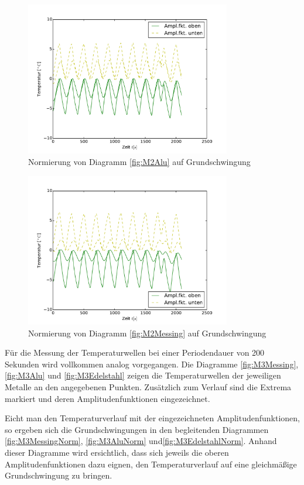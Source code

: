 \begin{figure}[htp]
	\label{fig:M2MessingNorm}
	\centering
	\includegraphics[width=0.8\textwidth]{Bilder/Normierungsauswahl/M2_Alu_norm.pdf}
	\caption{Normierung von Diagramm \ref{fig:M2Alu} auf Grundschwingung}
\end{figure}
\begin{figure}[htp]
	\label{fig:M2AluNorm}
	\centering
	\includegraphics[width=0.8\textwidth]{Bilder/Normierungsauswahl/M2_Messing_norm.pdf}
	\caption{Normierung von Diagramm \ref{fig:M2Messing} auf Grundschwingung}
\end{figure}
Für die Messung der Temperaturwellen bei einer Periodendauer von 200 Sekunden wird vollkommen analog vorgegangen.
Die Diagramme \ref{fig:M3Messing}, \ref{fig:M3Alu} und \ref{fig:M3Edelstahl} zeigen die Temperaturwellen der jeweiligen Metalle an den angegebenen Punkten. 
Zusätzlich zum Verlauf sind die Extrema markiert und deren Amplitudenfunktionen eingezeichnet.

Eicht man den Temperaturverlauf mit der eingezeichneten Amplitudenfunktionen, so ergeben sich die Grundschwingungen in den begleitenden Diagrammen \ref{fig:M3MessingNorm}, \ref{fig:M3AluNorm} und\ref{fig:M3EdelstahlNorm}. 
Anhand dieser Diagramme wird ersichtlich, dass sich jeweils die oberen Amplitudenfunktionen dazu eignen, den Temperaturverlauf auf eine gleichmäßige Grundschwingung zu bringen.\\

